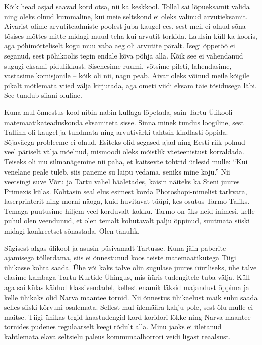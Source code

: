 Kõik head asjad saavad kord otsa, nii ka keskkool. Tollal sai lõpueksamit valida ning oleks olnud kummaline, kui meie 
seltskond ei oleks valinud arvutieksamit. Aivarist olime arvutiteadmiste poolest juba kaugel 
ees, sest meil ei olnud sõna tõsises mõttes mitte midagi muud teha kui arvutit 
torkida. Laulsin küll ka kooris, 
aga põhimõtteliselt kogu muu vaba aeg oli arvutite päralt. Isegi õppetöö ei 
seganud, sest põhikoolis tegin endale kõva põhja alla. Kõik see ei 
vähendanud sugugi eksami pidulikkust. Sisenesime ruumi, võtsime pileti, 
lahendasime, vastasime komisjonile -- kõik oli nii, nagu peab. Aivar oleks võinud 
meile kõigile pikalt mõtlemata viied välja kirjutada, aga ometi viidi eksam täie tõsidusega läbi. 
See tundub siiani oluline.

Kuna mul õnnestus kool nibin-nabin kullaga lõpetada, sain Tartu Ülikooli 
matemaatikateaduskonda eksamiteta 
sisse. Sinna minek tundus loogiline, sest Tallinn oli kaugel ja tundmata ning 
arvutivärki tahtsin kindlasti õppida. Sõjaväega probleeme ei olnud. Esiteks 
olid segased ajad ning Eesti riik polnud veel päriselt välja mõelnud, mismoodi 
oleks mõistlik väeteenistust korraldada. 
Teiseks oli mu silmanägemine nii paha, 
et kaitseväe tohtrid ütlesid mulle: \enquote{Kui venelane peale tuleb, 
siis paneme su laipu vedama, seniks mine koju.} Nii veetsingi suve Võru ja 
Tartu vahel hääletades, käisin näiteks ka Steni 
juures 
Primexis külas. Kohtasin seal elus esimest korda Photoshopi-nimelist tarkvara, laserprinterit ning morni näoga, kuid
huvitavat tüüpi, kes osutus Tarmo Taliks. Temaga puutusime
hiljem veel korduvalt kokku. Tarmo on üks neid inimesi, kelle puhul olen veendunud,
et olen temalt kohutavalt palju õppinud, suutmata siiski midagi konkreetset sõnastada. 
Olen tänulik. 

Sügisest algas ülikool ja asusin püsivamalt Tartusse. Kuna jäin paberite ajamisega 
töllerdama, siis ei õnnestunud koos teiste matemaatikutega Tiigi ühikasse kohta saada. Ühe või kaks talve olin sugulase juures üüriliseks, ühe talve 
elasime kambaga Tartu Kurtide Ühingus, mis üüris
tudengitele tuba välja. Küll aga sai külas käidud klassivendadel, kellest enamik 
läksid majandust õppima ja kelle ühikaks olid Narva maantee 
tornid. Nii õnnestus ühikaelust maik suhu saada selles siiski kõrvuni osalemata. 
Sellest mul ülemäära kahju pole, sest õlu mulle ei maitse. Tiigi ühikas 
tegid kaastudengid kord koridori lõkke ning Narva maantee tornides pudenes regulaarselt 
keegi rõdult alla. Minu jaoks ei ületanud kahtlemata elava seltsielu paleus 
kommunaalhorrori veidi ligast reaalsust. 

